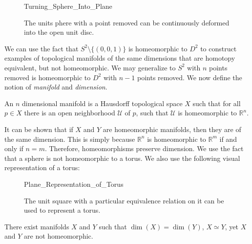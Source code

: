 \documentclass[crop=false,class=article,oneside]{standalone}
\begin{document}
        \begin{figure}[H]
            \centering
            \captionsetup{type=figure}
            {Turning_Sphere_Into_Plane}
            \caption[%
                Homeomorphism From
                $S^{2}\setminus\{(0,0,1)\}$ and $D^{2}$%
            ]{%
                The units phere with a point removed
                can be continuously deformed
                into the open unit disc.%
            }
            \label{fig:my_label}
        \end{figure}
        We can use the fact that $S^{2}\setminus \{(0,0,1)\}$
        is homeomorphic to $D^{2}$ to construct examples of
        topological manifolds of the same dimensions that are
        homotopy equivalent, but not homeomorphic. We may
        generalize to $S^{2}$ with $n$ points removed is
        homeomorphic to $D^{2}$ with $n-1$ points removed.
        We now define the notion of
        \textit{manifold} and \textit{dimension}.
        \begin{definition}
            An $n$ dimensional manifold is a Hausdorff
            topological space $X$ such that for all
            $p\in{X}$ there is an open neighborhood
            $\mathcal{U}$ of $p$, such that $\mathcal{U}$
            is homeomorphic to $\mathbb{R}^{n}$.
        \end{definition}
        It can be shown that if $X$ and $Y$ are homeomorphic
        manifolds, then they are of the same dimension.
        This is simply because $\mathbb{R}^{n}$ is homeomorphic
        to $\mathbb{R}^{m}$ if and only if $n=m$. Therefore,
        homeomorphisms preserve dimension. We use the fact that
        a sphere is not homeomorphic to a torus. We also use
        the following visual representation of a torus:
        \begin{figure}[H]
            \centering
            \captionsetup{type=figure}
            
                      {Plane_Representation_of_Torus}
            \caption[Plane Representation of a Torus]{%
                The unit square with a particular
                equivalence relation on it can be
                used to represent a torus.%
            }
            \label{%
                fig:surgery_theory_plane_representation_%
                of_a_torus%
            }
        \end{figure}
        \begin{theorem}
            There exist manifolds $X$ and $Y$ such that
            $\dim(X)=\dim(Y)$, ${X}\simeq{Y}$,
            yet $X$ and $Y$ are not homeomorphic.
        \end{theorem}
\end{document}
